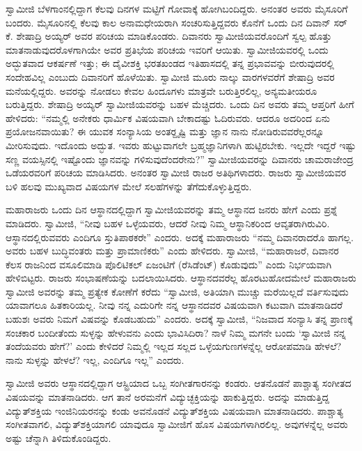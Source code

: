  ಸ್ವಾಮೀಜಿ ಬೆಳಗಾಂನಲ್ಲಿದ್ದಾಗ ಕೆಲವು ದಿನಗಳ ಮಟ್ಟಿಗೆ ಗೋವಾಕ್ಕೆ ಹೋಗಿಬಂದಿದ್ದರು. ಅನಂತರ ಅವರು ಮೈಸೂರಿಗೆ ಬಂದರು. ಮೈಸೂರಿನಲ್ಲಿ ಕೆಲವು ಕಾಲ ಅನಾಮಧೇಯರಾಗಿ ಸಂಚರಿಸುತ್ತಿದ್ದವರು ಕೊನೆಗೆ ಒಂದು ದಿನ ದಿವಾನ್ ಸರ್ ಕೆ. ಶೇಷಾದ್ರಿ ಅಯ್ಯರ್ ಅವರ ಪರಿಚಯ ಮಾಡಿಕೊಂಡರು. ದಿವಾನರು ಸ್ವಾಮೀಜಿಯವರೊಂದಿಗೆ ಸ್ವಲ್ಪ ಹೊತ್ತು ಮಾತನಾಡುವುದರೊಳಗಾಗಿಯೇ ಅವರ ಪ್ರತಿಭೆಯ ಪರಿಚಯ ಇವರಿಗೆ ಆಯಿತು. ಸ್ವಾಮೀಜಿಯವರಲ್ಲಿ ಒಂದು ಅದ್ಭುತವಾದ ಆಕರ್ಷಣೆ ಇತ್ತು; ಈ ದೈವೀಶಕ್ತಿ ಭರತಖಂಡದ ಇತಿಹಾಸದಲ್ಲಿ ತನ್ನ ಪ್ರಭಾವವನ್ನು ಬೀರುವುದರಲ್ಲಿ ಸಂದೇಹವಿಲ್ಲ ಎಂಬುದು ದಿವಾನರಿಗೆ ಹೊಳೆಯಿತು. ಸ್ವಾಮೀಜಿ ಮೂರು ನಾಲ್ಕು ವಾರಗಳವರೆಗೆ ಶೇಷಾದ್ರಿ ಅವರ ಮನೆಯಲ್ಲಿದ್ದರು. ಅವರನ್ನು ನೋಡಲು ಕೇವಲ ಹಿಂದೂಗಳು ಮಾತ್ರವೇ ಬರುತ್ತಿರಲಿಲ್ಲ, ಅನ್ಯಮತೀಯರೂ ಬರುತ್ತಿದ್ದರು. ಶೇಷಾದ್ರಿ ಅಯ್ಯರ್ ಸ್ವಾಮೀಜಿಯವರನ್ನು ಬಹಳ ಮೆಚ್ಚಿದರು. ಒಂದು ದಿನ ಅವರು ತಮ್ಮ ಆಪ್ತರಿಗೆ ಹೀಗೆ ಹೇಳಿದರು: “ನಮ್ಮಲ್ಲಿ ಅನೇಕರು ಧಾರ್ಮಿಕ ವಿಷಯವಾಗಿ ಬೇಕಾದಷ್ಟು ಓದಿರುವರು. ಆದರೂ ಅದರಿಂದ ಏನು ಪ್ರಯೋಜನವಾಯಿತು? ಈ ಯುವಕ ಸಂನ್ಯಾಸಿಯ ಅಂತರ್‍ದೃಷ್ಟಿ ಮತ್ತು ಜ್ಞಾನ ನಾನು ನೋಡಿರುವವರೆಲ್ಲರನ್ನೂ ಮೀರಿಸುವುದು. ಇದೊಂದು ಅದ್ಭುತ. ಇವರು ಹುಟ್ಟುವಾಗಲೇ ಬ್ರಹ್ಮಜ್ಞಾನಿಗಳಾಗಿ ಹುಟ್ಟಿರಬೇಕು. ಇಲ್ಲದೇ ಇದ್ದರೆ ಇಷ್ಟು ಸಣ್ಣ ವಯಸ್ಸಿನಲ್ಲಿ ಇಷ್ಟೊಂದು ಜ್ಞಾನವನ್ನು ಗಳಿಸುವುದೆಂದರೇನು?” ಸ್ವಾಮೀಜಿಯವರನ್ನು ದಿವಾನರು ಚಾಮರಾಜೇಂದ್ರ ಒಡೆಯರವರಿಗೆ ಪರಿಚಯ ಮಾಡಿಸಿದರು. ಅನಂತರ ಸ್ವಾಮೀಜಿ ರಾಜರ ಅತಿಥಿಗಳಾದರು. ರಾಜರು ಸ್ವಾಮೀಜಿಯವರ ಬಳಿ ಹಲವು ಮುಖ್ಯವಾದ ವಿಷಯಗಳ ಮೇಲೆ ಸಲಹೆಗಳನ್ನು ತೆಗೆದುಕೊಳ್ಳುತ್ತಿದ್ದರು. 

 ಮಹಾರಾಜರು ಒಂದು ದಿನ ಆಸ್ಥಾನದಲ್ಲಿದ್ದಾಗ ಸ್ವಾಮೀಜಿಯವರನ್ನು ತಮ್ಮ ಆಸ್ಥಾನದ ಜನರು ಹೇಗೆ ಎಂದು ಪ್ರಶ್ನೆ ಮಾಡಿದರು. ಸ್ವಾಮೀಜಿ, “ನೀವು ಬಹಳ ಒಳ್ಳೆಯವರು, ಆದರೆ ನೀವು ನಿಮ್ಮ ಆಸ್ಥಾನಿಕರಿಂದ ಆವೃತರಾಗಿರುವಿರಿ. ಆಸ್ಥಾನದಲ್ಲಿರುವವರು ಎಂದಿಗೂ ಸ್ತುತಿಪಾಠಕರೇ” ಎಂದರು. ಅದಕ್ಕೆ ಮಹಾರಾಜರು “ನಮ್ಮ ದಿವಾನರಾದರೊ ಹಾಗಲ್ಲ. ಅವರು ಬಹಳ ಬುದ್ಧಿವಂತರು ಮತ್ತು ಪ್ರಾಮಾಣಿಕರು” ಎಂದು ಹೇಳಿದರು. ಸ್ವಾಮೀಜಿ, “ಮಹಾರಾಜರೆ, ದಿವಾನರ ಕೆಲಸ ರಾಜನಿಂದ ವಸೂಲಿಮಾಡಿ ಪೊಲಿಟಿಕಲ್ ಏಜಂಟಿಗೆ (ರೆಸಿಡೆಂಟ್) ಕೊಡುವುದು” ಎಂದು ನಿರ್ಭಯವಾಗಿ ಹೇಳಿಬಿಟ್ಟರು. ರಾಜರು ಸಂಭಾಷಣೆಯನ್ನು ಬದಲಾಯಿಸಿದರು. ಆಸ್ಥಾನದವರೆಲ್ಲ ಹೊರಟುಹೋದಮೇಲೆ ಮಹಾರಾಜರು ಸ್ವಾಮೀಜಿ ಅವರನ್ನು ತಮ್ಮ ಪ್ರತ್ಯೇಕ ಕೋಣೆಗೆ ಕರೆದು “ಸ್ವಾಮೀಜಿ, ಅತಿಯಾಗಿ ಮುಚ್ಚು ಮರೆಯಿಲ್ಲದೆ ವರ್ತಿಸುವುದು ಯಾವಾಗಲೂ ಹಿತಕಾರಿಯಲ್ಲ. ನೀವು ನನ್ನ ಎದುರಿಗೇ ನನ್ನ ಆಸ್ಥಾನದವರ ವಿಷಯವಾಗಿ ಕಟುವಾಗಿ ಮಾತನಾಡಿದರೆ ಬಹುಶಃ ಅವರು ನಿಮಗೆ ವಿಷವನ್ನು ಕೊಡಬಹುದು” ಎಂದರು. ಅದಕ್ಕೆ ಸ್ವಾಮೀಜಿ, “ನಿಜವಾದ ಸಂನ್ಯಾಸಿ ತನ್ನ ಪ್ರಾಣಕ್ಕೆ ಸಂಚಕಾರ ಬಂದೀತೆಂದು ಸುಳ್ಳನ್ನು ಹೇಳುವನು ಎಂದು ಭಾವಿಸಿದಿರಾ? ನಾಳೆ ನಿಮ್ಮ ಮಗನೇ ಬಂದು ‘ಸ್ವಾಮೀಜಿ ನನ್ನ ತಂದೆಯವರು ಹೇಗೆ?’ ಎಂದು ಕೇಳಿದರೆ ನಿಮ್ಮಲ್ಲಿ ಇಲ್ಲದ ಸಲ್ಲದ ಒಳ್ಳೆಯ\break ಗುಣಗಳನ್ನೆಲ್ಲ ಆರೋಪಮಾಡಿ ಹೇಳಲೆ? ನಾನು ಸುಳ್ಳನ್ನು ಹೇಳಲೆ? ಇಲ್ಲ, ಎಂದಿಗೂ ಇಲ್ಲ” ಎಂದರು. 

 ಸ್ವಾಮೀಜಿ ಅವರು ಆಸ್ಥಾನದಲ್ಲಿದ್ದಾಗ ಆಸ್ಟ್ರಿಯಾದ ಒಬ್ಬ ಸಂಗೀತಗಾರನನ್ನು ಕಂಡರು. ಆತನೊಡನೆ ಪಾಶ್ಚಾತ್ಯ ಸಂಗೀತದ ವಿಷಯವನ್ನು ಮಾತನಾಡಿದರು. ಆಗ ತಾನೆ ಅರಮನೆಗೆ ವಿದ್ಯುಚ್ಛಕ್ತಿಯನ್ನು ಹಾಕುತ್ತಿದ್ದರು. ಅದನ್ನು ಮಾಡುತ್ತಿದ್ದ ವಿದ್ಯುತ್‍ಶಕ್ತಿಯ ಇಂಜಿನಿಯರನನ್ನು ಕಂಡು ಅವನೊಡನೆ ವಿದ್ಯುತ್‍ಶಕ್ತಿಯ ವಿಷಯವಾಗಿ ಮಾತನಾಡಿದರು. ಪಾಶ್ಚಾತ್ಯ ಸಂಗೀತವಾಗಲಿ, ವಿದ್ಯುತ್‍ಶಕ್ತಿಯಾಗಲಿ ಯಾವುದೂ ಸ್ವಾಮೀಜಿಗೆ ಹೊಸ ವಿಷಯಗಳಾಗಿರಲಿಲ್ಲ. ಅವುಗಳನ್ನೆಲ್ಲ ಅವರು ಅಷ್ಟು ಚೆನ್ನಾಗಿ ತಿಳಿದುಕೊಂಡಿದ್ದರು. 

